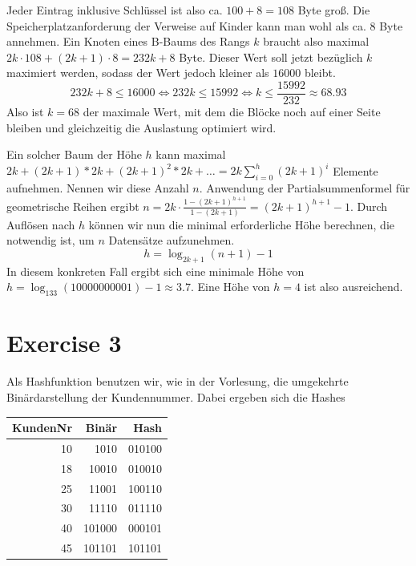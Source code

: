 \documentclass[10pt,a4paper]{article}
\begin{document}
Jeder Eintrag inklusive Schlüssel ist also ca. $100 + 8 = 108$ Byte groß.
Die Speicherplatzanforderung der Verweise auf Kinder kann man wohl als ca. $8$ Byte annehmen.
Ein Knoten eines B-Baums des Rangs $k$ braucht also maximal $2k \cdot 108 + (2k + 1) \cdot 8 = 232k + 8$ Byte.
Dieser Wert soll jetzt bezüglich $k$ maximiert werden, sodass der Wert jedoch kleiner als $16000$ bleibt.
\begin{equation*}
  232k + 8 \le 16000 \Leftrightarrow 232k \le 15992 \Leftrightarrow k \le \frac{15992}{232} \approx 68.93
\end{equation*}
Also ist $k = 68$ der maximale Wert, mit dem die Blöcke noch auf einer Seite bleiben und gleichzeitig die Auslastung optimiert wird.

Ein solcher Baum der Höhe $h$ kann maximal $2k + (2k + 1) * 2k + (2k + 1)^{2} * 2k + \dots = 2k \sum_{i = 0}^{h} (2k + 1)^{i}$ Elemente aufnehmen.
Nennen wir diese Anzahl $n$.
Anwendung der Partialsummenformel für geometrische Reihen ergibt $n = 2k \cdot \frac{1 - (2k + 1)^{h + 1}}{1 - (2k + 1)} = (2k + 1)^{h + 1} - 1$.
Durch Auflösen nach $h$ können wir nun die minimal erforderliche Höhe berechnen, die notwendig ist, um $n$ Datensätze aufzunehmen.
\begin{equation*}
  h = \log_{2k + 1}(n + 1) - 1
\end{equation*}
In diesem konkreten Fall ergibt sich eine minimale Höhe von $h = \log_{133}(10000000001) - 1 \approx 3.7$.
Eine Höhe von $h = 4$ ist also ausreichend.

\section*{Exercise 3}

Als Hashfunktion benutzen wir, wie in der Vorlesung, die umgekehrte Binärdarstellung der Kundennummer.
Dabei ergeben sich die Hashes

\begin{tabular}{rrr}
KundenNr & Binär & Hash\\
\hline
10 & 1010 & 010100\\
18 & 10010 & 010010\\
25 & 11001 & 100110\\
30 & 11110 & 011110\\
40 & 101000 & 000101\\
45 & 101101 & 101101\\
\end{tabular}

\end{document}
